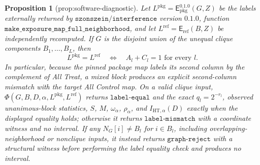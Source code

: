 \documentclass{article}
\newtheorem{proposition}{Proposition}
\begin{document}
\begin{proposition}[prop:software-diagnostic]\label{prop:software-diagnostic}
Let \(L^{\mathrm{pkg}}=\mathsf E_{\mathrm{pkg}}^{0.1.0}(G,Z)\) be the labels externally returned by \(\texttt{szonszein/interference}\) version \(0.1.0\), function \(\texttt{make\_exposure\_map\_full\_neighborhood}\), and let \(L^{\mathrm{ref}}=\mathsf E_{\mathrm{ref}}(B,Z)\) be independently recomputed. If \(G\) is the disjoint union of the unequal clique components \(B_1,\ldots,B_L\), then \[L^{\mathrm{pkg}}=L^{\mathrm{ref}}\quad\Longleftrightarrow\quad A_l+C_l=1\text{ for every }l.\] In particular, because the pinned package map labels its second column by the complement of All Treat, a mixed block produces an explicit second-column mismatch with the target All Control map. On a valid clique input, \(\Phi(G,B,D,\alpha,L^{\mathrm{pkg}},L^{\mathrm{ref}})\) returns \(\texttt{label-equal}\) and the exact \(q_l=2^{-r_l}\), observed unanimous-block statistics, \(S\), \(M\), \(\omega_\alpha\), \(\rho_\alpha\), and \(I_{\mathrm{HT},\alpha}(D)\) exactly when the displayed equality holds; otherwise it returns \(\texttt{label-mismatch}\) with a coordinate witness and no interval. If any \(N_G[i]\ne B_l\) for \(i\in B_l\), including overlapping-neighborhood or nonclique inputs, it instead returns \(\texttt{graph-reject}\) with a structural witness before performing the label equality check and produces no interval.
\end{proposition}
\end{document}
